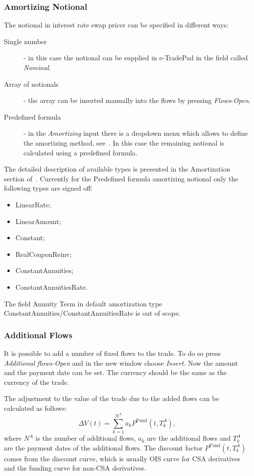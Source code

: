 \documentclass[]{pmv_report} %
\begin{document}
\subsubsection{Amortizing Notional}
The notional in interest rate swap pricer can be specified in different ways:
\begin{description}
  \item[Single number] - in this case the notional can be supplied in e-TradePad in the field called \textit{Nominal}.
  \item[Array of notionals] - the array can be inserted manually into the flows by pressing \textit{Flows}-\textit{Open}.
  \item[Predefined formula] - in the \textit{Amortizing} input there is a dropdown menu which allows to define the amortizing method, see~\cite{Mx.LoanDeposit}.
  In this case the remaining notional is calculated using a predefined formula.
\end{description}
The detailed description of available types is presented in the Amortization section of~\cite{Mx.GenericFunctionalities}.
Currently for the Predefined formula amortizing notional only the following types are signed off:
\begin{itemize}
\item LinearRate;
\item LinearAmount;
\item Constant;
\item RealCouponReinv;
\item ConstantAnnuities;
\item ConstantAnnuitiesRate.
\end{itemize}
The field Annuity Term in default amortization type ConstantAnnuities/ConstantAnnuitiesRate is out of scope.

\subsubsection{Additional Flows}
It is possible to add a number of fixed flows to the trade. To do so press \textit{Additional flows-Open} and in the new window choose \textit{Insert}.
Now the amount and the payment date can be set.
The currency should be the same as the currency of the trade.

The adjustment to the value of the trade due to the added flows can be calculated as follows:
\begin{equation*}
\Delta V(t)=\sum_{k=1}^{N^A} a_k P^{\text{Fund}}(t,T_k^A),
\end{equation*}
where $N^A$ is the number of additional flows, $a_k$ are the additional flows and $T_k^A$ are the payment dates of the additional flows.
The discount factor $P^{\text{Fund}}(t,T_k^A)$ comes from the discount curve, which is usually OIS curve for CSA derivatives and the funding curve for non-CSA derivatives.
\end{document}
